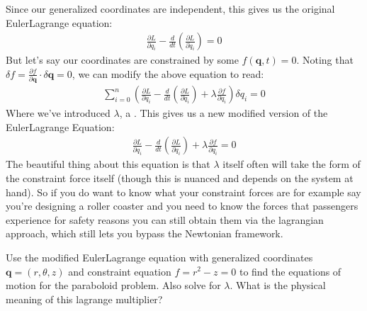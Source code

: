 \documentclass[letterpaper,10pt,english]{jupyterBook}
\begin{document}
\sphinxAtStartPar
Since our generalized coordinates are independent, this gives us the original Euler\sphinxhyphen{}Lagrange equation:
\begin{equation*}
\begin{split}
\frac{\partial L}{\partial q_i} - \frac{d}{dt}\left(\frac{\partial L}{\partial \dot{q}_i}\right) = 0
\end{split}
\end{equation*}
\sphinxAtStartPar
But let’s say our coordinates are constrained by some \(f(\mathbf{q},t) = 0\). Noting that \(\delta f = \frac{\partial f}{\partial \mathbf{q}}\cdot \delta \mathbf{q} = 0\), we can modify the above equation to read:
\begin{equation*}
\begin{split}
\sum_{i=0}^n \left(\frac{\partial L}{\partial q_i} - \frac{d}{dt}\left(\frac{\partial L}{\partial \dot{q}_i}\right)  + \lambda \frac{\partial f}{\partial q_i}\right) \delta q_i = 0
\end{split}
\end{equation*}
\sphinxAtStartPar
Where we’ve introduced \(\lambda\), a . This gives us a new modified version of the Euler\sphinxhyphen{}Lagrange Equation:
\begin{equation*}
\begin{split}
\frac{\partial L}{\partial q_i} - \frac{d}{dt}\left(\frac{\partial L}{\partial \dot{q}_i}\right)  + \lambda \frac{\partial f}{\partial q_i} = 0
\end{split}
\end{equation*}
\sphinxAtStartPar
The beautiful thing about this equation is that \(\lambda\) itself often will take the form of the constraint force itself (though this is nuanced and depends on the system at hand). So if you do want to know what your constraint forces are \sphinxhyphen{} for example say you’re designing a roller coaster and you need to know the forces that passengers experience for safety reasons \sphinxhyphen{} you can still obtain them via the lagrangian approach, which still lets you bypass the Newtonian framework.

\sphinxAtStartPar
{}

\sphinxAtStartPar
Use the modified Euler\sphinxhyphen{}Lagrange equation with generalized coordinates \(\mathbf{q} = (r,\theta, z)\) and constraint equation \(f = r^2 - z = 0\) to find the equations of motion for the paraboloid problem. Also solve for \(\lambda\). What is the physical meaning of this lagrange multiplier?
\end{document}

